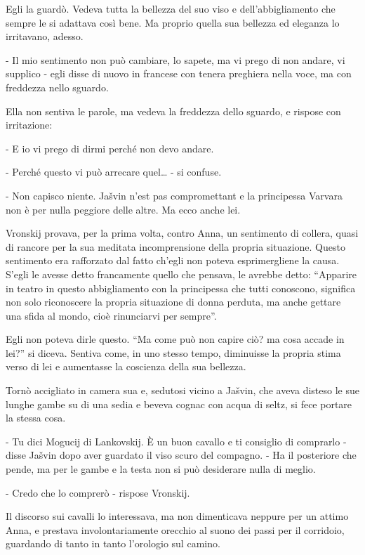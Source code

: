 Egli la guardò. Vedeva tutta la bellezza del suo viso e dell'abbigliamento che sempre le si adattava così bene. Ma proprio quella sua bellezza ed eleganza lo irritavano, adesso. 

- Il mio sentimento non può cambiare, lo sapete, ma vi prego di non andare, vi supplico - egli disse di nuovo in francese con tenera preghiera nella voce, ma con freddezza nello sguardo. 

Ella non sentiva le parole, ma vedeva la freddezza dello sguardo, e rispose con irritazione: 

- E io vi prego di dirmi perché non devo andare. 

- Perché questo vi può arrecare quel\ldots{} - si confuse. 

- Non capisco niente. Jašvin n'est pas compromettant e la principessa Varvara non è per nulla peggiore delle altre. Ma ecco anche lei. 

Vronskij provava, per la prima volta, contro Anna, un sentimento di collera, quasi di rancore per la sua meditata incomprensione della propria situazione. Questo sentimento era rafforzato dal fatto ch'egli non poteva esprimergliene la causa. S'egli le avesse detto francamente quello che pensava, le avrebbe detto: ``Apparire in teatro in questo abbigliamento con la principessa che tutti conoscono, significa non solo riconoscere la propria situazione di donna perduta, ma anche gettare una sfida al mondo, cioè rinunciarvi per sempre''. 

Egli non poteva dirle questo. ``Ma come può non capire ciò? ma cosa accade in lei?'' si diceva. Sentiva come, in uno stesso tempo, diminuisse la propria stima verso di lei e aumentasse la coscienza della sua bellezza. 

Tornò accigliato in camera sua e, sedutosi vicino a Jašvin, che aveva disteso le sue lunghe gambe su di una sedia e beveva cognac con acqua di seltz, si fece portare la stessa cosa. 

- Tu dici Mogucij di Lankovskij. È un buon cavallo e ti consiglio di comprarlo - disse Jašvin dopo aver guardato il viso scuro del compagno. - Ha il posteriore che pende, ma per le gambe e la testa non si può desiderare nulla di meglio. 

- Credo che lo comprerò - rispose Vronskij. 

Il discorso sui cavalli lo interessava, ma non dimenticava neppure per un attimo Anna, e prestava involontariamente orecchio al suono dei passi per il corridoio, guardando di tanto in tanto l'orologio sul camino. 

